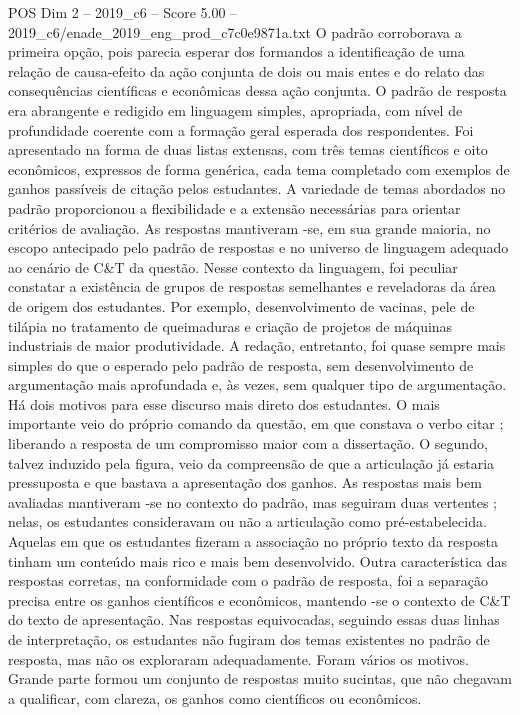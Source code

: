 \begin{textsample}{POS Dim 2 – 2019\_c6 – Score 5.00 – 2019\_c6/enade\_2019\_eng\_prod\_c7c0e9871a.txt}
O padrão corroborava a primeira opção, pois parecia esperar dos formandos a identificação de uma relação de causa-efeito da ação conjunta de dois ou mais entes e do relato das consequências científicas e econômicas dessa ação conjunta.
O padrão de resposta era abrangente e redigido em linguagem simples, apropriada, com nível de profundidade coerente com a formação geral esperada dos respondentes.
Foi apresentado na forma de duas listas extensas, com três temas científicos e oito econômicos, expressos de forma genérica, cada tema completado com exemplos de ganhos passíveis de citação pelos estudantes.
A variedade de temas abordados no padrão proporcionou a flexibilidade e a extensão necessárias para orientar critérios de avaliação.
As respostas mantiveram -se, em sua grande maioria, no escopo antecipado pelo padrão de respostas e no universo de linguagem adequado ao cenário de C\&T da questão.
Nesse contexto da linguagem, foi peculiar constatar a existência de grupos de respostas semelhantes e reveladoras da área de origem dos estudantes.
Por exemplo, desenvolvimento de vacinas, pele de tilápia no tratamento de queimaduras e criação de projetos de máquinas industriais de maior produtividade.
A redação, entretanto, foi quase sempre mais simples do que o esperado pelo padrão de resposta, sem desenvolvimento de argumentação mais aprofundada e, às vezes, sem qualquer tipo de argumentação.
Há dois motivos para esse discurso mais direto dos estudantes.
O mais importante veio do próprio comando da questão, em que constava o verbo citar ; liberando a resposta de um compromisso maior com a dissertação.
O segundo, talvez induzido pela figura, veio da compreensão de que a articulação já estaria pressuposta e que bastava a apresentação dos ganhos.
As respostas mais bem avaliadas mantiveram -se no contexto do padrão, mas seguiram duas vertentes ; nelas, os estudantes consideravam ou não a articulação como pré-estabelecida.
Aquelas em que os estudantes fizeram a associação no próprio texto da resposta tinham um conteúdo mais rico e mais bem desenvolvido.
Outra característica das respostas corretas, na conformidade com o padrão de resposta, foi a separação precisa entre os ganhos científicos e econômicos, mantendo -se o contexto de C\&T do texto de apresentação.
Nas respostas equivocadas, seguindo essas duas linhas de interpretação, os estudantes não fugiram dos temas existentes no padrão de resposta, mas não os exploraram adequadamente.
Foram vários os motivos.
Grande parte formou um conjunto de respostas muito sucintas, que não chegavam a qualificar, com clareza, os ganhos como científicos ou econômicos.

\end{textsample}
